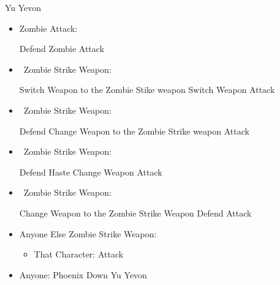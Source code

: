 \begin{battle}[99999]{Yu Yevon}
    \begin{itemize}
        \item Zombie Attack:
        \begin{itemize}
            \yunaf Defend
            \tidusf Zombie Attack
        \end{itemize}
        \item \yuna\ Zombie Strike Weapon:
        \begin{itemize}
            \yunaf Switch Weapon to the Zombie Stike weapon
            \tidusf Switch Weapon
            \yunaf Attack
        \end{itemize}
        \item \tidus\ Zombie Strike Weapon:
        \begin{itemize}
            \yunaf Defend
            \tidusf Change Weapon to the Zombie Strike weapon
            \tidusf Attack
        \end{itemize}
        \item \rikku\ Zombie Strike Weapon:
        \begin{itemize}
            \yunaf Defend
            \tidusf Haste \rikku
            \yunaf Change Weapon
            \rikkuf Attack
        \end{itemize}
        \item \auron\ Zombie Strike Weapon:
        \begin{itemize}
            \switch{\yuna}{\auron}
            \auronf Change Weapon to the Zombie Strike Weapon
            \tidusf Defend
            \auronf Attack
        \end{itemize}
        \item Anyone Else Zombie Strike Weapon:
        \begin{itemize}
            \item That Character: Attack
        \end{itemize}
        \item Anyone: Phoenix Down Yu Yevon
    \end{itemize}
\end{battle}
\colstart
